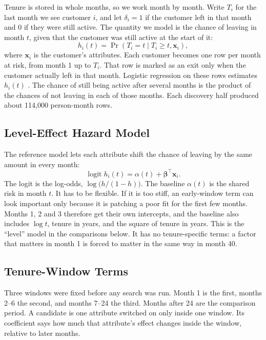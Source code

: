 \documentclass[conference]{IEEEtran}
\begin{document}
Tenure is stored in whole months, so we work month by month. Write $T_i$ for the last month we see customer $i$, and let $\delta_i = 1$ if the customer left in that month and $0$ if they were still active. The quantity we model is the chance of leaving in month $t$, given that the customer was still active at the start of it:
\begin{equation}
h_i(t) = \Pr(T_i = t \mid T_i \ge t, \mathbf{x}_i),
\end{equation}
where $\mathbf{x}_i$ is the customer's attributes. Each customer becomes one row per month at risk, from month 1 up to $T_i$. That row is marked as an exit only when the customer actually left in that month. Logistic regression on these rows estimates $h_i(t)$ \cite{allison1982}. The chance of still being active after several months is the product of the chances of not leaving in each of those months. Each discovery half produced about 114,000 person-month rows.

\subsection{Level-Effect Hazard Model}

The reference model lets each attribute shift the chance of leaving by the same amount in every month:
\begin{equation}
\operatorname{logit} h_i(t) = \alpha(t) + \boldsymbol{\beta}^{\top}\mathbf{x}_i .
\end{equation}
The logit is the log-odds, $\log\bigl(h/(1-h)\bigr)$. The baseline $\alpha(t)$ is the shared risk in month $t$. It has to be flexible. If it is too stiff, an early-window term can look important only because it is patching a poor fit for the first few months. Months 1, 2 and 3 therefore get their own intercepts, and the baseline also includes $\log t$, tenure in years, and the square of tenure in years. This is the ``level'' model in the comparisons below. It has no tenure-specific terms: a factor that matters in month 1 is forced to matter in the same way in month 40.

\subsection{Tenure-Window Terms}

Three windows were fixed before any search was run. Month 1 is the first, months 2--6 the second, and months 7--24 the third. Months after 24 are the comparison period. A candidate is one attribute switched on only inside one window. Its coefficient says how much that attribute's effect changes inside the window, relative to later months.
\end{document}
